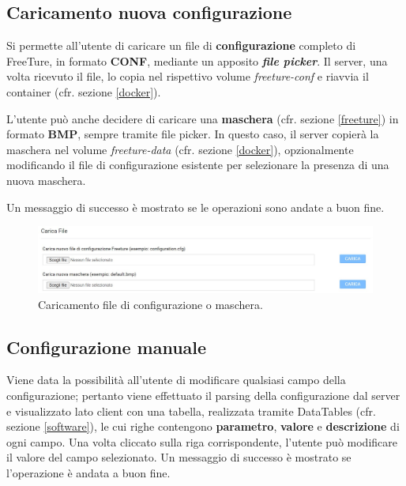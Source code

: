 \subsection{Caricamento nuova configurazione}

Si permette all'utente di caricare un file di \textbf{configurazione} completo di FreeTure, in formato \textbf{CONF}, mediante un apposito \textbf{\emph{file picker}}. Il server, una volta ricevuto il file, lo copia nel rispettivo volume \emph{freeture-conf} e riavvia il container (cfr. sezione \ref{docker}).

L'utente può anche decidere di caricare una \textbf{maschera} (cfr. sezione \ref{freeture}) in formato \textbf{BMP}, sempre tramite file picker. In questo caso, il server copierà la maschera nel volume \emph{freeture-data} (cfr. sezione \ref{docker}), opzionalmente modificando il file di configurazione esistente per selezionare la presenza di una nuova maschera.

Un messaggio di successo è mostrato se le operazioni sono andate a buon fine.

\begin{figure}[H]
    \begin{center}
    \includegraphics[width=\textwidth]{images/ft-carica-file.jpg}
    \caption{Caricamento file di configurazione o maschera.}
    \end{center}
\end{figure}

\subsection{Configurazione manuale}

Viene data la possibilità all'utente di modificare qualsiasi campo della configurazione; pertanto viene effettuato il parsing della configurazione dal server e visualizzato lato client con una tabella, realizzata tramite DataTables (cfr. sezione \ref{software}), le cui righe contengono \textbf{parametro}, \textbf{valore} e \textbf{descrizione} di ogni campo. Una volta cliccato sulla riga corrispondente, l'utente può modificare il valore del campo selezionato.
Un messaggio di successo è mostrato se l'operazione è andata a buon fine.


